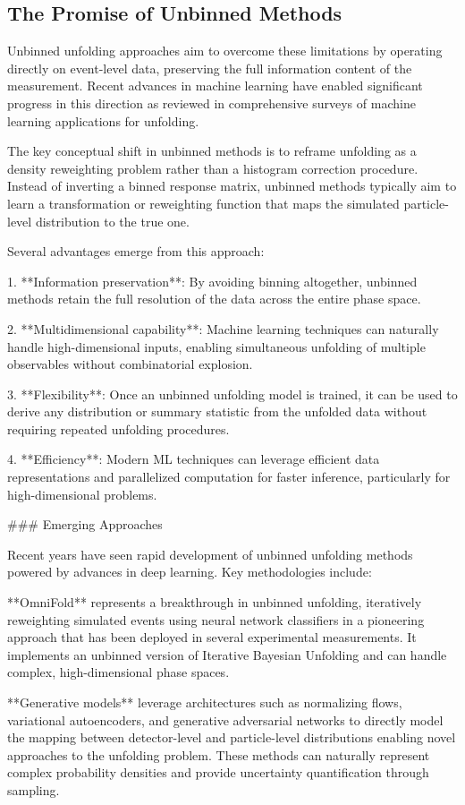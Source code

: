     \subsection{The Promise of Unbinned Methods}
        Unbinned unfolding approaches aim to overcome these limitations by operating directly on event-level data, preserving the full information content of the measurement. Recent advances in machine learning have enabled significant progress in this direction as reviewed in comprehensive surveys of machine learning applications for unfolding.

The key conceptual shift in unbinned methods is to reframe unfolding as a density reweighting problem rather than a histogram correction procedure. Instead of inverting a binned response matrix, unbinned methods typically aim to learn a transformation or reweighting function that maps the simulated particle-level distribution to the true one.

Several advantages emerge from this approach:

1. **Information preservation**: By avoiding binning altogether, unbinned methods retain the full resolution of the data across the entire phase space.

2. **Multidimensional capability**: Machine learning techniques can naturally handle high-dimensional inputs, enabling simultaneous unfolding of multiple observables without combinatorial explosion.

3. **Flexibility**: Once an unbinned unfolding model is trained, it can be used to derive any distribution or summary statistic from the unfolded data without requiring repeated unfolding procedures.

4. **Efficiency**: Modern ML techniques can leverage efficient data representations and parallelized computation for faster inference, particularly for high-dimensional problems.

### Emerging Approaches

Recent years have seen rapid development of unbinned unfolding methods powered by advances in deep learning. Key methodologies include:

**OmniFold** represents a breakthrough in unbinned unfolding, iteratively reweighting simulated events using neural network classifiers in a pioneering approach that has been deployed in several experimental measurements. It implements an unbinned version of Iterative Bayesian Unfolding and can handle complex, high-dimensional phase spaces.

**Generative models** leverage architectures such as normalizing flows, variational autoencoders, and generative adversarial networks to directly model the mapping between detector-level and particle-level distributions enabling novel approaches to the unfolding problem. These methods can naturally represent complex probability densities and provide uncertainty quantification through sampling.

